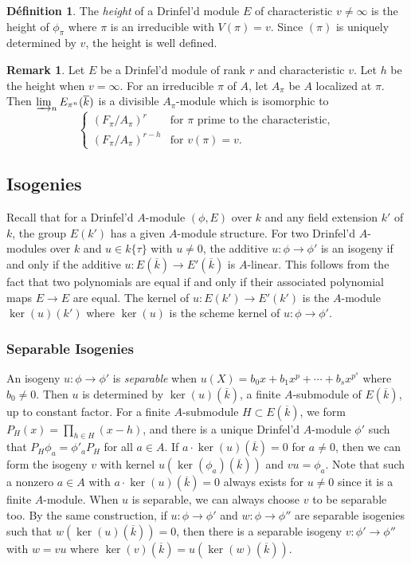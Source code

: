 \documentclass[12pt,a4paper]{article}
\theoremstyle{plain}
\theoremstyle{definition}
\newtheorem{definition}{D\'efinition}[section]
\newtheorem{remark}{Remark}[section]
\theoremstyle{remark}
\begin{document}
\begin{definition}
\label{def:height}
The \emph{height} of a Drinfel'd module $E$ of characteristic $v \neq \infty$ is the height of $\phi_\pi$ where $\pi$ is an irreducible with $V(\pi) = v$. Since $(\pi)$ is uniquely determined by $v$, the height is well defined.
\end{definition}

\begin{remark}
\label{rem:tate}
Let $E$ be a Drinfel'd module of rank $r$ and characteristic $v$. Let $h$ be the height when $v = \infty$. For an irreducible $\pi$ of $A$, let $A_\pi$ be $A$ localized at $\pi$. Then $\varinjlim_n E_{\pi^n}(\overline{k})$ is a divisible $A_\pi$-module which is isomorphic to
\[
\begin{cases} (F_\pi/A_\pi)^r & \text{for } \pi \text{ prime to the characteristic}, \\ (F_\pi/A_\pi)^{r-h} & \text{for } v(\pi) = v. \end{cases}
\]
\end{remark}

\subsection{Isogenies}
\label{sec:isogenies}

Recall that for a Drinfel'd $A$-module $(\phi, E)$ over $k$ and any field extension $k'$ of $k$, the group $E(k')$ has a given $A$-module structure. For two Drinfel'd $A$-modules over $k$ and $u \in k\{\tau\}$ with $u \neq 0$, the additive $u: \phi \to \phi'$ is an isogeny if and only if the additive $u: E(\overline{k}) \to E'(\overline{k})$ is $A$-linear. This follows from the fact that two polynomials are equal if and only if their associated polynomial maps $E \to E$ are equal. The kernel of $u: E(k') \to E'(k')$ is the $A$-module $\ker(u)(k')$ where $\ker(u)$ is the scheme kernel of $u: \phi \to \phi'$.

\subsubsection*{Separable Isogenies}

An isogeny $u: \phi \to \phi'$ is \emph{separable} when $u(X) = b_0 x + b_1 x^p + \cdots + b_s x^{p^s}$ where $b_0 \neq 0$. Then $u$ is determined by $\ker(u)(\overline{k})$, a finite $A$-submodule of $E(\overline{k})$, up to constant factor. For a finite $A$-submodule $H \subset E(\overline{k})$, we form $P_H(x) = \prod_{h \in H} (x - h)$, and there is a unique Drinfel'd $A$-module $\phi'$ such that $P_H \phi_a = \phi'_a P_H$ for all $a \in A$. If $a \cdot \ker(u)(\overline{k}) = 0$ for $a \neq 0$, then we can form the isogeny $v$ with kernel $u(\ker(\phi_a)(\overline{k}))$ and $vu = \phi_a$. Note that such a nonzero $a \in A$ with $a \cdot \ker(u)(\overline{k}) = 0$ always exists for $u \neq 0$ since it is a finite $A$-module. When $u$ is separable, we can always choose $v$ to be separable too. By the same construction, if $u: \phi \to \phi'$ and $w: \phi \to \phi''$ are separable isogenies such that $w(\ker(u)(\overline{k})) = 0$, then there is a separable isogeny $v: \phi' \to \phi''$ with $w = vu$ where $\ker(v)(\overline{k}) = u(\ker(w)(\overline{k}))$.
\end{document}
